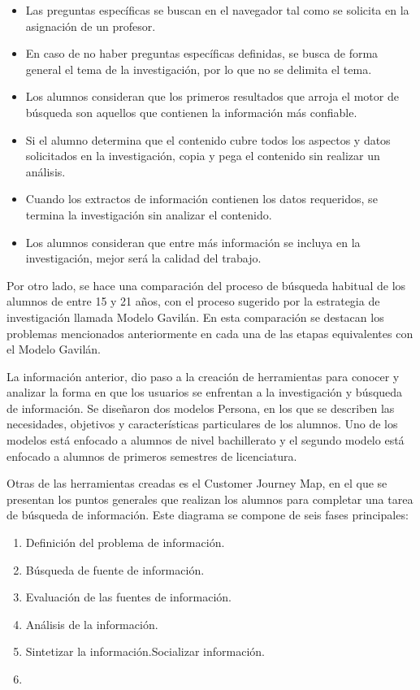 \begin{itemize}
  \item Las preguntas específicas se buscan en el navegador tal como se solicita en la asignación de un profesor.
  \item En caso de no haber preguntas específicas definidas, se busca de forma general el tema de la investigación, por lo que no se delimita el tema.
  \item Los alumnos consideran que los primeros resultados que arroja el motor de búsqueda son aquellos que contienen la información más confiable.
  \item Si el alumno determina que el contenido cubre todos los aspectos y datos solicitados en la investigación, copia y pega el contenido sin realizar un análisis.
  \item Cuando los extractos de información contienen los datos requeridos, se termina la investigación sin analizar el contenido.
  \item Los alumnos consideran que entre más información se incluya en la investigación, mejor será la calidad del trabajo.
\end{itemize}

Por otro lado, se hace una comparación del proceso de búsqueda habitual de los alumnos de entre 15 y 21 años, con el proceso sugerido por la estrategia de investigación llamada Modelo Gavilán. En esta comparación se destacan los problemas mencionados anteriormente en cada una de las etapas equivalentes con el Modelo Gavilán.

La información anterior, dio paso a la creación de herramientas para conocer y analizar la forma en que los usuarios se enfrentan a la investigación y búsqueda de información. Se diseñaron dos modelos Persona, en los que se describen las necesidades, objetivos y características particulares de los alumnos. Uno de los modelos está enfocado a alumnos de nivel bachillerato y el segundo modelo está enfocado a alumnos de primeros semestres de licenciatura.

Otras de las herramientas creadas es el Customer Journey Map, en el que se presentan los puntos generales que realizan los alumnos para completar una tarea de búsqueda de información. Este diagrama se compone de seis fases principales:

\begin{enumerate}
  \item Definición del problema de información.
  \item Búsqueda de fuente de información.
  \item Evaluación de las fuentes de información.
  \item Análisis de la información.
  \item Sintetizar la información.Socializar información.
  \item 
\end{enumerate}

